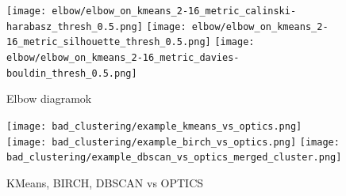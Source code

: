 \documentclass[12pt,a4paper]{article}
\begin{document}
\begin{figure}
    \centering
    \texttt{[image: elbow/elbow\_on\_kmeans\_2-16\_metric\_calinski-harabasz\_thresh\_0.5.png]}
    \centering
    \texttt{[image: elbow/elbow\_on\_kmeans\_2-16\_metric\_silhouette\_thresh\_0.5.png]}
    \centering
    \texttt{[image: elbow/elbow\_on\_kmeans\_2-16\_metric\_davies-bouldin\_thresh\_0.5.png]}

    \caption{Elbow diagramok}
    \label{fig: Elbow diagramok}
\end{figure}

\begin{figure}
    \centering
    \texttt{[image: bad\_clustering/example\_kmeans\_vs\_optics.png]}
    \centering
    \texttt{[image: bad\_clustering/example\_birch\_vs\_optics.png]}
    \centering
    \texttt{[image: bad\_clustering/example\_dbscan\_vs\_optics\_merged\_cluster.png]}

    \caption{KMeans, BIRCH, DBSCAN vs OPTICS}
    \label{fig: Bad clusters}
\end{figure}
\end{document}
